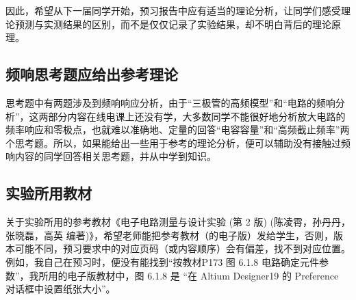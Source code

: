 \documentclass[UTF8]{article}
\begin{document}
因此，希望从下一届同学开始，预习报告中应有适当的理论分析，让同学们感受理论预测与实测结果的区别，而不是仅仅记录了实验结果，却不明白背后的理论原理。

\subsection{频响思考题应给出参考理论}

思考题中有两题涉及到频响响应分析，由于“三极管的高频模型”和“电路的频响分析”，这两部分内容在线电课上还没有学，大多数同学不能很好地分析放大电路的频率响应和零极点，也就难以准确地、定量的回答“电容容量”和“高频截止频率”两个思考题。所以，如果能给出一些用于参考的理论分析，便可以辅助没有接触过频响内容的同学回答相关思考题，并从中学到知识。

\subsection{实验所用教材}

关于实验所用的参考教材《电子电路测量与设计实验 (第 2 版) (陈凌霄，孙丹丹，张晓磊，高英 编著)》，希望老师能把参考教材（的电子版）发给学生，否则，版本可能不同，预习要求中的对应页码（或内容顺序）会有偏差，找不到对应位置。例如，我自己在预习时，便没有能找到“按教材P173 图 6.1.8 电路确定元件参数”，我所用的电子版教材中，图 6.1.8 是 “在 Altium Designer19 的 Preference 对话框中设置纸张大小”。





\end{document}
